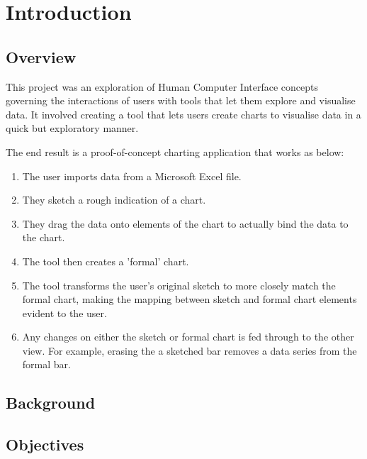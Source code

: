 \chapter{Introduction}
\section{Overview}
This project was an exploration of Human Computer Interface concepts governing the interactions of users with tools that let them explore and visualise data. It involved creating a tool that lets users create charts to visualise data in a quick but exploratory manner. 

The end result is a proof-of-concept charting application that works as below:
\begin{enumerate}
\item The user imports data from a Microsoft Excel file.
\item They sketch a rough indication of a chart.
\item They drag the data onto elements of the chart to actually bind the data to the chart. 
\item The tool then creates a 'formal' chart.
\item The tool transforms the user's original sketch to more closely match the formal chart, making the mapping between sketch and formal chart elements evident to the user.
\item Any changes on either the sketch or formal chart is fed through to the other view. For example, erasing the a sketched bar removes a data series from the formal bar.
\end{enumerate}

\section{Background}
\section{Objectives}